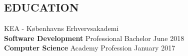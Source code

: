 \documentclass[margin, 10pt, hidelinks]{res} %
\newcommand{\tab}{\hspace*{1em}} %
\newcommand{\emphasize}{\large\bfseries} %
\begin{document}
\begin{resume}
\section{EDUCATION}

KEA - Københavns Erhvervsakademi 	\\
{\emphasize Software Development}  Professional Bachelor   \hfill  June 2018\\
{\emphasize Computer Science}  Academy Profession  \hfill  January 2017 \\









\end{resume}
\end{document}
